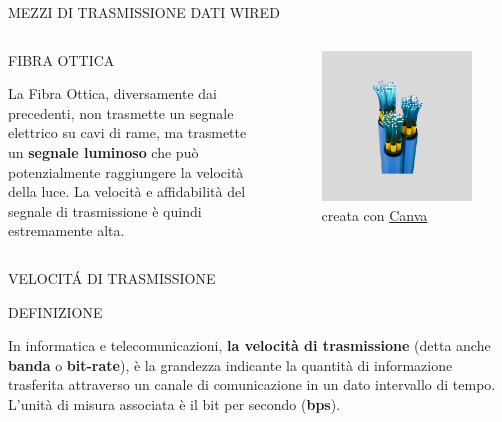 \documentclass[aspectratio=1610,handout]{beamer}
\begin{document}
\begin{frame}{MEZZI DI TRASMISSIONE DATI WIRED}
    \begin{columns}
        \begin{alertblock}{FIBRA OTTICA}
            \begin{minipage}{0.97\linewidth}
                \justifying
                La Fibra Ottica, diversamente dai precedenti, non trasmette un segnale elettrico 
                su cavi di rame, ma trasmette un \textbf{segnale luminoso} che può potenzialmente raggiungere 
                la velocità della luce. La velocità e affidabilità del segnale di trasmissione è quindi 
                estremamente alta.
            \end{minipage}
        \end{alertblock}
           \begin{figure}
               \includegraphics[width=\linewidth]{img/fibra_ottica.png}
               \caption{{creata con \href{https://www.canva.com/}{Canva}}}
           \end{figure}
    \end{columns}
\end{frame}

\begin{frame}{VELOCIT\'A DI TRASMISSIONE}
    \begin{alertblock}{DEFINIZIONE}
        \begin{minipage}{0.98\linewidth}
            \justifying
            In informatica e telecomunicazioni, \textbf{la velocità di trasmissione} 
            (detta anche \textbf{banda} o \textbf{bit-rate}), 
            è la grandezza indicante la quantità di informazione trasferita 
            attraverso un canale di comunicazione in un dato intervallo di tempo. 
            L'unità di misura associata è il bit per secondo (\textbf{bps}).
        \end{minipage}
    \end{alertblock}
\end{frame}
\end{document}
